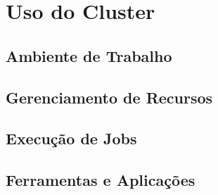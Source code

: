 \chapter{Uso do Cluster}
\label{chap:uso-do-cluster}

\section{Ambiente de Trabalho}
\label{sec:ambiente-de-trabalho}

\lipsum[1-2]

\section{Gerenciamento de Recursos}
\label{sec:gerenciamento-de-recursos}

\lipsum[1-2]

\section{Execução de Jobs}
\label{sec:execucao-de-jobs}

\lipsum[1-2]

\section{Ferramentas e Aplicações}
\label{sec:ferramentas-e-aplicacoes}

\lipsum[1-2]
